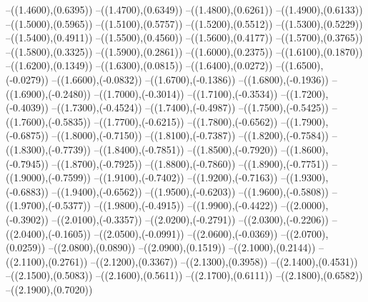 {	--({\sx*(1.4600)},{\sy*(0.6395)})
	--({\sx*(1.4700)},{\sy*(0.6349)})
	--({\sx*(1.4800)},{\sy*(0.6261)})
	--({\sx*(1.4900)},{\sy*(0.6133)})
	--({\sx*(1.5000)},{\sy*(0.5965)})
	--({\sx*(1.5100)},{\sy*(0.5757)})
	--({\sx*(1.5200)},{\sy*(0.5512)})
	--({\sx*(1.5300)},{\sy*(0.5229)})
	--({\sx*(1.5400)},{\sy*(0.4911)})
	--({\sx*(1.5500)},{\sy*(0.4560)})
	--({\sx*(1.5600)},{\sy*(0.4177)})
	--({\sx*(1.5700)},{\sy*(0.3765)})
	--({\sx*(1.5800)},{\sy*(0.3325)})
	--({\sx*(1.5900)},{\sy*(0.2861)})
	--({\sx*(1.6000)},{\sy*(0.2375)})
	--({\sx*(1.6100)},{\sy*(0.1870)})
	--({\sx*(1.6200)},{\sy*(0.1349)})
	--({\sx*(1.6300)},{\sy*(0.0815)})
	--({\sx*(1.6400)},{\sy*(0.0272)})
	--({\sx*(1.6500)},{\sy*(-0.0279)})
	--({\sx*(1.6600)},{\sy*(-0.0832)})
	--({\sx*(1.6700)},{\sy*(-0.1386)})
	--({\sx*(1.6800)},{\sy*(-0.1936)})
	--({\sx*(1.6900)},{\sy*(-0.2480)})
	--({\sx*(1.7000)},{\sy*(-0.3014)})
	--({\sx*(1.7100)},{\sy*(-0.3534)})
	--({\sx*(1.7200)},{\sy*(-0.4039)})
	--({\sx*(1.7300)},{\sy*(-0.4524)})
	--({\sx*(1.7400)},{\sy*(-0.4987)})
	--({\sx*(1.7500)},{\sy*(-0.5425)})
	--({\sx*(1.7600)},{\sy*(-0.5835)})
	--({\sx*(1.7700)},{\sy*(-0.6215)})
	--({\sx*(1.7800)},{\sy*(-0.6562)})
	--({\sx*(1.7900)},{\sy*(-0.6875)})
	--({\sx*(1.8000)},{\sy*(-0.7150)})
	--({\sx*(1.8100)},{\sy*(-0.7387)})
	--({\sx*(1.8200)},{\sy*(-0.7584)})
	--({\sx*(1.8300)},{\sy*(-0.7739)})
	--({\sx*(1.8400)},{\sy*(-0.7851)})
	--({\sx*(1.8500)},{\sy*(-0.7920)})
	--({\sx*(1.8600)},{\sy*(-0.7945)})
	--({\sx*(1.8700)},{\sy*(-0.7925)})
	--({\sx*(1.8800)},{\sy*(-0.7860)})
	--({\sx*(1.8900)},{\sy*(-0.7751)})
	--({\sx*(1.9000)},{\sy*(-0.7599)})
	--({\sx*(1.9100)},{\sy*(-0.7402)})
	--({\sx*(1.9200)},{\sy*(-0.7163)})
	--({\sx*(1.9300)},{\sy*(-0.6883)})
	--({\sx*(1.9400)},{\sy*(-0.6562)})
	--({\sx*(1.9500)},{\sy*(-0.6203)})
	--({\sx*(1.9600)},{\sy*(-0.5808)})
	--({\sx*(1.9700)},{\sy*(-0.5377)})
	--({\sx*(1.9800)},{\sy*(-0.4915)})
	--({\sx*(1.9900)},{\sy*(-0.4422)})
	--({\sx*(2.0000)},{\sy*(-0.3902)})
	--({\sx*(2.0100)},{\sy*(-0.3357)})
	--({\sx*(2.0200)},{\sy*(-0.2791)})
	--({\sx*(2.0300)},{\sy*(-0.2206)})
	--({\sx*(2.0400)},{\sy*(-0.1605)})
	--({\sx*(2.0500)},{\sy*(-0.0991)})
	--({\sx*(2.0600)},{\sy*(-0.0369)})
	--({\sx*(2.0700)},{\sy*(0.0259)})
	--({\sx*(2.0800)},{\sy*(0.0890)})
	--({\sx*(2.0900)},{\sy*(0.1519)})
	--({\sx*(2.1000)},{\sy*(0.2144)})
	--({\sx*(2.1100)},{\sy*(0.2761)})
	--({\sx*(2.1200)},{\sy*(0.3367)})
	--({\sx*(2.1300)},{\sy*(0.3958)})
	--({\sx*(2.1400)},{\sy*(0.4531)})
	--({\sx*(2.1500)},{\sy*(0.5083)})
	--({\sx*(2.1600)},{\sy*(0.5611)})
	--({\sx*(2.1700)},{\sy*(0.6111)})
	--({\sx*(2.1800)},{\sy*(0.6582)})
	--({\sx*(2.1900)},{\sy*(0.7020)})
}
